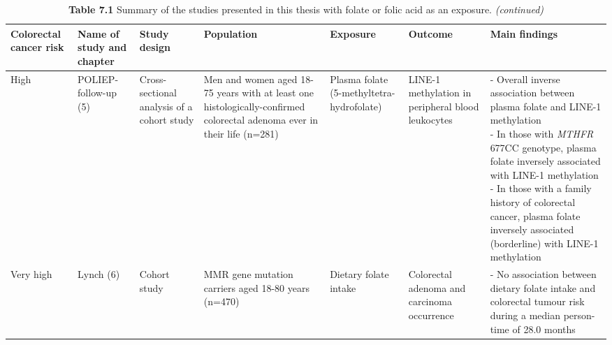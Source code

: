 \begin{sidewaystable}
\footnotesize
\caption*{\textbf{Table 7.1} {Summary of the studies presented in this thesis with folate or folic acid as an exposure.} \emph{(continued)}}
\begin{tabular}{L{1.3cm}C{1.5cm}C{2cm}C{2.1cm}C{2.1cm}C{2.1cm}C{4cm}}
\hline
\bfseries Colorectal cancer risk & \bfseries Name of study and chapter & \bfseries Study design & \bfseries Population & \bfseries Exposure & \bfseries Outcome & \bfseries Main findings\\
\hline
\parbox[t][5cm]{1.3cm}{High} &
\parbox[t][5cm]{1.5cm}{\centering POLIEP-follow-up (5)} &
\parbox[t][5cm]{2cm}{\centering Cross-sectional analysis of a cohort study} &
\parbox[t][5cm]{2.1cm}{\centering Men and women aged 18-75 years with at least one histologically-confirmed colorectal adenoma ever in their life (n=281)} &
\parbox[t][5cm]{2.1cm}{\centering Plasma folate (5-methyltetra-hydrofolate)} &
\parbox[t][5cm]{2.1cm}{\centering LINE-1 methylation in peripheral blood leukocytes} &
\parbox[t][5cm]{4cm}{\centering - Overall inverse association between plasma folate and LINE-1 methylation \\ - In those with \emph{MTHFR} 677CC genotype, plasma folate inversely associated with LINE-1 methylation \\ - In those with a family history of colorectal cancer, plasma folate inversely associated (borderline) with LINE-1 methylation}\\

\parbox[t][2.3cm]{1.3cm}{Very high} &
\parbox[t][2.3cm]{1.5cm}{\centering Lynch (6)} &
\parbox[t][2.3cm]{2cm}{\centering Cohort study} &
\parbox[t][2.3cm]{2.1cm}{\centering MMR gene mutation carriers aged 18-80 years (n=470)} &
\parbox[t][2.3cm]{2.1cm}{\centering Dietary folate intake} &
\parbox[t][2.3cm]{2.1cm}{\centering Colorectal adenoma and carcinoma occurrence} &
\parbox[t][2.3cm]{4cm}{ \centering - No association between dietary folate intake and colorectal tumour risk during a median person-time of 28.0 months}\\
\hline
\end{tabular}
\end{sidewaystable}


